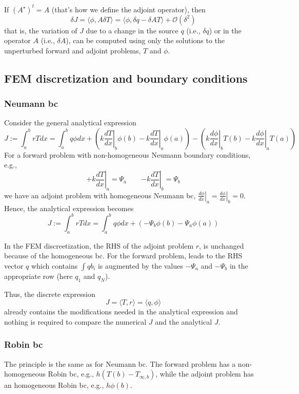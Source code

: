\documentclass[11pt]{article}
\begin{document}
If $(A^\star)^t=A$ (that's how we define the adjoint operator), then
\[
\delta J = \langle \phi, A \delta T \rangle = \langle \phi, \delta q - \delta A T \rangle + \mathcal{O}(\delta^2)
\]
that is, the variation of $J$ due to a change in the source $q$ (i.e., $\delta q$) or in the operator $A$ (i.e., $\delta A$), can be computed using only the solutions to the unperturbed forward and adjoint problems, $T$ and $\phi$.

\subsection{FEM discretization and boundary conditions}
\subsubsection{Neumann bc}

Consider the general analytical expression 
\[
J := \int_a^b rT dx 
= \int_a^b q \phi dx + \left( \left.k \frac{dT}{dx}\right|_b\phi(b) -\left.k \frac{dT}{dx}\right|_a\phi(a) \right)
-\left( \left.k \frac{d\phi}{dx}\right|_bT(b) -\left.k \frac{d\phi}{dx}\right|_aT(a) \right) 
\]
For a forward problem with non-homogeneous Neumann boundary conditions, e.g.,
\[
\left.+k \frac{dT}{dx}\right|_a = \Psi_a
\qquad 
\left.-k \frac{dT}{dx}\right|_b = \Psi_b
\]
we have an adjoint problem with homogeneous Neumann bc, $\left.\frac{d\phi}{dx}\right|_a = \left.\frac{d\phi}{dx}\right|_b=0$.
Hence, the analytical expression becomes
\[
J := \int_a^b rT dx 
= \int_a^b q \phi dx + \left( -\Psi_b\phi(b) -\Psi_a\phi(a) \right)
\]

In the FEM discreetization, the RHS of the adjoint problem $r$, is unchanged because of the homogeneous bc. For the forward problem,
leads to the RHS vector $q$ which contains $\int q b_i$ is augmented by the values $-\Psi_a$ and $-\Psi_b$ in the appropriate row (here $q_1$ and $q_N$).

Thus, the discrete expression 
\[
J = \langle T, r \rangle = \langle q, \phi \rangle
\]
already contains the modifications needed in the analytical expression and nothing is required to compare the numerical $J$ and the analytical $J$.

\subsubsection{Robin bc}
The principle is the same as for Neumann bc. The forward problem has a non-homogeneous Robin bc, e.g., $h(T(b)-T_{\infty,b})$, while the adjoint problem has an homogeneous Robin bc, e.g., $h\phi(b)$. 
\end{document}
